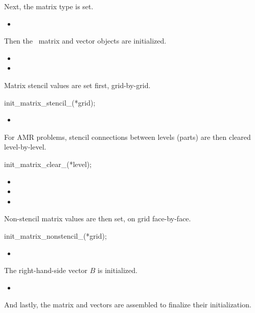 \documentclass[10pt]{article}
\begin{document}
Next, the matrix type is set.

\begin{itemize}
\item {}
\end{itemize}

Then the \hypre\ matrix and vector objects are initialized.

\begin{itemize}
\item {}
\item {}
\end{itemize}

Matrix stencil values are set first, grid-by-grid.

      init\_matrix\_stencil\_(*grid);

\begin{itemize}
\item {}
\end{itemize}

For AMR problems, stencil connections between levels (parts) are then
cleared level-by-level.

    init\_matrix\_clear\_(*level);

\begin{itemize}
\item {}
\item {}
\item {}
\end{itemize}

Non-stencil matrix values are then set, on grid face-by-face.

      init\_matrix\_nonstencil\_(*grid);

\begin{itemize}
\item {}
\end{itemize}

The right-hand-side vector $B$ is initialized.

\begin{itemize}
\item {}
\end{itemize}

And lastly, the matrix and vectors are assembled to finalize their
initialization.
\end{document}
